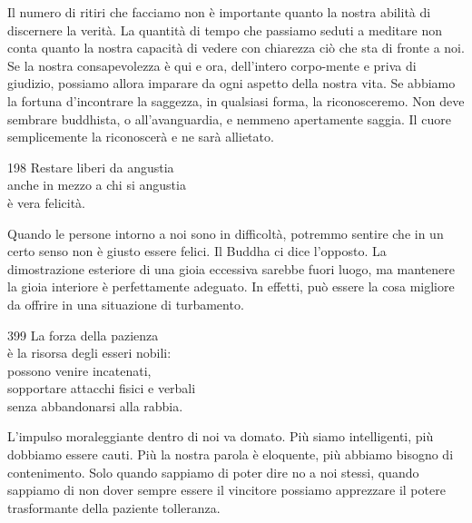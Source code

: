 \begin{dhpRefl}
  Il numero di ritiri che facciamo non è importante quanto la nostra abilità di
  discernere la verità. La quantità di tempo che passiamo seduti a meditare non
  conta quanto la nostra capacità di vedere con chiarezza ciò che sta di fronte
  a noi. Se la nostra consapevolezza è qui e ora, dell'intero corpo-mente e
  priva di giudizio, possiamo allora imparare da ogni aspetto della nostra vita.
  Se abbiamo la fortuna d'incontrare la saggezza, in qualsiasi forma, la
  riconosceremo. Non deve sembrare buddhista, o all'avanguardia, e nemmeno
  apertamente saggia. Il cuore semplicemente la riconoscerà e ne sarà allietato.
\end{dhpRefl}


\begin{dhpVerse}{198}
\label{dhp-198}
Restare liberi da angustia\\
anche in mezzo a chi si angustia\\
è vera felicità.
\end{dhpVerse}

\begin{dhpRefl}
  Quando le persone intorno a noi sono in difficoltà, potremmo sentire che in un
  certo senso non è giusto essere felici. Il Buddha ci dice l'opposto. La
  dimostrazione esteriore di una gioia eccessiva sarebbe fuori luogo, ma
  mantenere la gioia interiore è perfettamente adeguato. In effetti, può essere
  la cosa migliore da offrire in una situazione di turbamento.
\end{dhpRefl}


\begin{dhpVerse}{399}
\label{dhp-399}
La forza della pazienza\\
è la risorsa degli esseri nobili:\\
possono venire incatenati,\\
sopportare attacchi fisici e verbali\\
senza abbandonarsi alla rabbia.
\end{dhpVerse}

\begin{dhpRefl}
  L'impulso moraleggiante dentro di noi va domato. Più siamo intelligenti, più
  dobbiamo essere cauti. Più la nostra parola è eloquente, più abbiamo bisogno
  di contenimento. Solo quando sappiamo di poter dire no a noi stessi, quando
  sappiamo di non dover sempre essere il vincitore possiamo apprezzare il potere
  trasformante della paziente tolleranza.
\end{dhpRefl}


